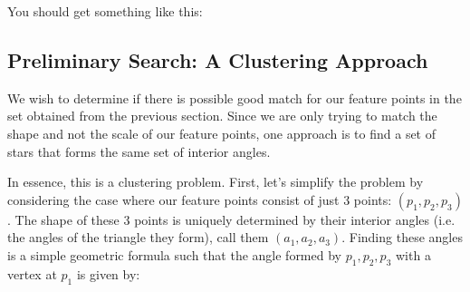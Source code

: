\documentclass[paper=a4, fontsize=11pt]{scrartcl} %
\begin{document}

You should get something like this:
\begin{figure}[!h]
\captionsetup{labelformat=empty}
\caption{}
\end{figure}

\subsection{Preliminary Search: A Clustering Approach}
We wish to determine if there is possible good match for our feature points in the set obtained from the previous section.  Since we are only trying to match the shape and not the scale of our feature points, one approach is to find a set of stars that forms the same set of interior angles.

In essence, this is a clustering problem. First, let's simplify the problem by considering the case where our feature points consist of just 3 points: $(p_1,p_2,p_3)$. The shape of these 3 points is uniquely determined by their interior angles (i.e. the angles of the triangle they form), call them $(a_1,a_2,a_3)$. Finding these angles is a simple geometric formula such that the angle formed by $p_1, p_2, p_3$ with a vertex at $p_1$ is given by:
\end{document}

